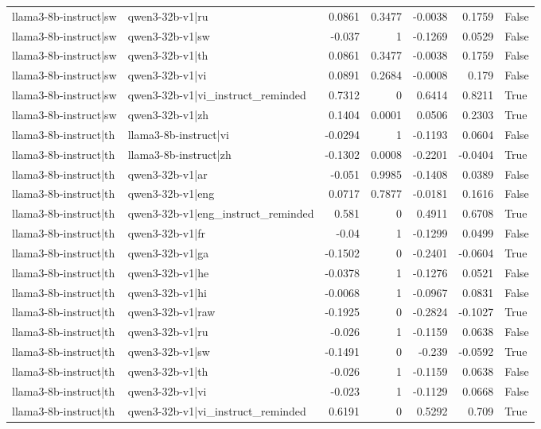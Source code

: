 \begin{table}
\begin{tabular}{l l r r r r l}
llama3-8b-instruct|sw & qwen3-32b-v1|ru & 0.0861 & 0.3477 & -0.0038 & 0.1759 & False \\
llama3-8b-instruct|sw & qwen3-32b-v1|sw & -0.037 & 1 & -0.1269 & 0.0529 & False \\
llama3-8b-instruct|sw & qwen3-32b-v1|th & 0.0861 & 0.3477 & -0.0038 & 0.1759 & False \\
llama3-8b-instruct|sw & qwen3-32b-v1|vi & 0.0891 & 0.2684 & -0.0008 & 0.179 & False \\
llama3-8b-instruct|sw & qwen3-32b-v1|vi_instruct_reminded & 0.7312 & 0 & 0.6414 & 0.8211 & True \\
llama3-8b-instruct|sw & qwen3-32b-v1|zh & 0.1404 & 0.0001 & 0.0506 & 0.2303 & True \\
llama3-8b-instruct|th & llama3-8b-instruct|vi & -0.0294 & 1 & -0.1193 & 0.0604 & False \\
llama3-8b-instruct|th & llama3-8b-instruct|zh & -0.1302 & 0.0008 & -0.2201 & -0.0404 & True \\
llama3-8b-instruct|th & qwen3-32b-v1|ar & -0.051 & 0.9985 & -0.1408 & 0.0389 & False \\
llama3-8b-instruct|th & qwen3-32b-v1|eng & 0.0717 & 0.7877 & -0.0181 & 0.1616 & False \\
llama3-8b-instruct|th & qwen3-32b-v1|eng_instruct_reminded & 0.581 & 0 & 0.4911 & 0.6708 & True \\
llama3-8b-instruct|th & qwen3-32b-v1|fr & -0.04 & 1 & -0.1299 & 0.0499 & False \\
llama3-8b-instruct|th & qwen3-32b-v1|ga & -0.1502 & 0 & -0.2401 & -0.0604 & True \\
llama3-8b-instruct|th & qwen3-32b-v1|he & -0.0378 & 1 & -0.1276 & 0.0521 & False \\
llama3-8b-instruct|th & qwen3-32b-v1|hi & -0.0068 & 1 & -0.0967 & 0.0831 & False \\
llama3-8b-instruct|th & qwen3-32b-v1|raw & -0.1925 & 0 & -0.2824 & -0.1027 & True \\
llama3-8b-instruct|th & qwen3-32b-v1|ru & -0.026 & 1 & -0.1159 & 0.0638 & False \\
llama3-8b-instruct|th & qwen3-32b-v1|sw & -0.1491 & 0 & -0.239 & -0.0592 & True \\
llama3-8b-instruct|th & qwen3-32b-v1|th & -0.026 & 1 & -0.1159 & 0.0638 & False \\
llama3-8b-instruct|th & qwen3-32b-v1|vi & -0.023 & 1 & -0.1129 & 0.0668 & False \\
llama3-8b-instruct|th & qwen3-32b-v1|vi_instruct_reminded & 0.6191 & 0 & 0.5292 & 0.709 & True \\

\end{tabular}
\end{table}
